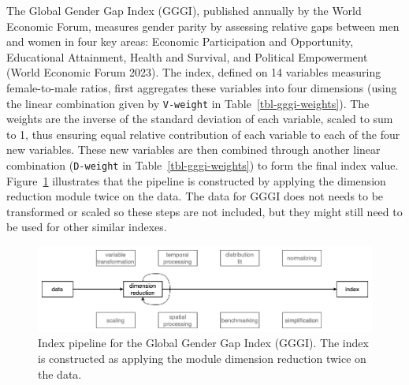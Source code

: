 \documentclass[
]{interact}
\begin{document}
The Global Gender Gap Index (GGGI), published annually by the World
Economic Forum, measures gender parity by assessing relative gaps
between men and women in four key areas: Economic Participation and
Opportunity, Educational Attainment, Health and Survival, and Political
Empowerment (World Economic Forum 2023). The index, defined on 14
variables measuring female-to-male ratios, first aggregates these
variables into four dimensions (using the linear combination given by
\texttt{V-weight} in Table~\ref{tbl-gggi-weights}). The weights are the
inverse of the standard deviation of each variable, scaled to sum to 1,
thus ensuring equal relative contribution of each variable to each of
the four new variables. These new variables are then combined through
another linear combination (\texttt{D-weight} in
Table~\ref{tbl-gggi-weights}) to form the final index value.
Figure~\ref{fig-pp-gggi} illustrates that the pipeline is constructed by
applying the dimension reduction module twice on the data. The data for
GGGI does not needs to be transformed or scaled so these steps are not
included, but they might still need to be used for other similar
indexes.

\begin{figure}

{\centering \includegraphics[width=1\textwidth,height=0.9\textheight]{figures/pipeline-gggi.png}

}

\caption{\label{fig-pp-gggi}Index pipeline for the Global Gender Gap
Index (GGGI). The index is constructed as applying the module dimension
reduction twice on the data.}

\end{figure}
\end{document}
